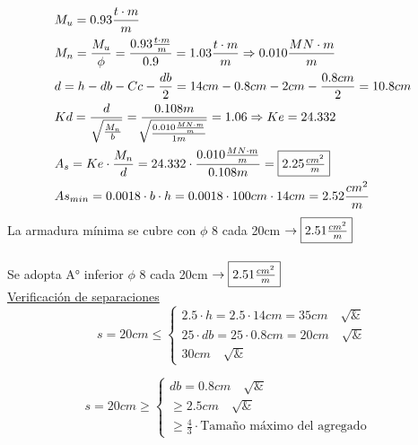 \begin{enumerate}
\begin{itemize}
\begin{align*}
& M_u = 0.93 \frac{t \cdot m}{m} \\
& M_n = \frac{M_u}{\phi} = \frac{0.93 \frac{t \cdot m}{m}}{0.9} = 1.03 \frac{t \cdot m}{m} \Rightarrow 0.010 \frac{MN \cdot m}{m} \\
& d = h -db - Cc - \frac{db}{2} = 14cm - 0.8cm - 2cm - \frac{0.8cm}{2}= 10.8cm \\
& Kd = \frac{d}{\sqrt{\frac{M_n}{b}}} = \frac{0.108m}{\sqrt[]{\frac{0.010 \frac{MN \cdot m}{m}}{1m}}} = 1.06 \Rightarrow Ke = 24.332 \\
& A_s = Ke \cdot \frac{M_n}{d} = 24.332 \cdot \frac{0.010 \frac{MN \cdot m}{m}}{0.108m} = \framebox{$2.25 \frac{cm^2}{m}$}\\
& As_{min} = 0.0018 \cdot b \cdot h = 0.0018 \cdot 100cm \cdot 14cm = 2.52 \frac{cm^2}{m}
\end{align*}
La armadura mínima se cubre con $\phi$ 8 cada 20cm $\rightarrow \framebox{$2.51 \frac{cm^2}{m}$}$ \\
\\
Se adopta A° inferior $\phi$ 8 cada 20cm $\rightarrow \framebox{$2.51 \frac{cm^2}{m}$}$ \\

\underline{Verificación de separaciones}\\

\[ s = 20cm \leq \left\{ \begin{array}{ll}
         2.5 \cdot h = 2.5 \cdot 14cm = 35cm \quad \surd & \\
         25 \cdot db = 25 \cdot 0.8cm = 20cm \quad \surd &\\
         30cm \quad \surd & \end{array} \right. \] 
         
\[ s = 20cm \geq \left\{ \begin{array}{ll}
         db = 0.8cm \quad \surd & \\
         \geq 2.5cm \quad \surd &\\
         \geq \frac{4}{3} \cdot \text{Tamaño máximo del agregado} & \end{array} \right. \] 

\end{itemize}
\end{enumerate}
